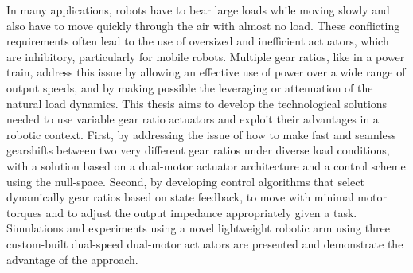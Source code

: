 In many applications, robots have to bear large loads while moving slowly and also have to move quickly through the air with almost no load. These conflicting requirements often lead to the use of oversized and inefficient actuators, which are inhibitory, particularly for mobile robots. Multiple gear ratios, like in a power train, address this issue by allowing an effective use of power over a wide range of output speeds, and by making possible the leveraging or attenuation of the natural load dynamics. This thesis aims to develop the technological solutions needed to use variable gear ratio actuators and exploit their advantages in a robotic context. First, by addressing the issue of how to make fast and seamless gearshifts between two very different gear ratios under diverse load conditions, with a solution based on a dual-motor actuator architecture and a control scheme using the null-space. Second, by developing control algorithms that select dynamically gear ratios based on state feedback, to move with minimal motor torques and to adjust the output impedance appropriately given a task. Simulations and experiments using a novel lightweight robotic arm using three custom-built dual-speed dual-motor actuators are presented and demonstrate the advantage of the approach. 


